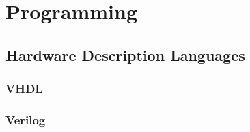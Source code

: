 \chapter{Programming}
\section{Hardware Description Languages}
\label{kap:HDL}
\subsection{VHDL}
\subsection{Verilog}